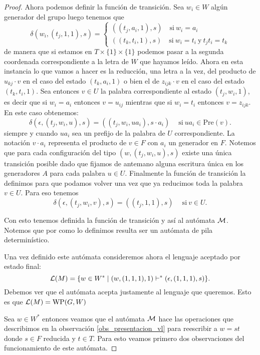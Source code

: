 \documentclass[tesis.tex]{subfiles}
\begin{document}
\begin{proof}
	Ahora podemos definir la función de transición. 
	Sea $w_i \in W$ algún generador del grupo luego tenemos que
	\[
	\delta(w_i,(t_j,1,1), s) =
		\begin{cases}
		 ((t_j,a_i,1), s) \quad \text{si} \ w_{i}=a_{i} \\
		 ((t_k,t_i,1), s) \quad \text{si} \ w_{i}=t_{i} \ \text{y} \ t_{j}t_{i} = t_{k}
	\end{cases}\]
	de manera que si estamos en $T \times \{ 1 \} \times \{ 1 \}$ podemos pasar a la segunda coordenada correspondiente a la letra de $W$ que hayamos leído.	
	Ahora en esta instancia lo que vamos a hacer es la reducción, una letra a la vez, del producto de $u_{kj} \cdot v$ en el caso del estado $(t_k,a_i,1)$ o bien el de $z_{ijk} \cdot v$ en el caso del estado $(t_k,t_i,1)$.
	Sea entonces $v \in U$ la palabra correspondiente al estado $(t_{j},w_{i},1)$, es decir que si $w_{i} = a_{i}$ entonces $v = u_{ij}$ mientras que si $w_{i} = t_{i}$ entonces $v = z_{ijk}$. 
	En este caso obtenemos:
	\begin{equation*}
		\delta(\epsilon,(t_j,w_i,u), s) = ((t_j,w_i,u a_i), s \cdot a_i ) \quad \ \text{si} \ ua_{i} \in \text{Pre}(v).
	\end{equation*}
	siempre y cuando $ua_i$ sea un prefijo de la palabra de $U$ correspondiente.
	La notación $v \cdot a_{i}$ representa el producto de $v \in F$ con $a_{i}$ un generador en $F$.
	Notemos que para cada configuración del tipo $(w,(t_{j}, w_{i}, u),s)$ existe una única transición posible dado que fijamos de antemano alguna escritura única en los generadores $A$ para cada palabra $u \in U$.
	Finalmente la función de transición la definimos para que podamos volver una vez que ya reducimos toda la palabra $v \in U$.
	Para eso tenemos 
	\begin{equation*}
		\delta(\epsilon,(t_j,w_i,v), s) = ((t_j,1,1), s) \quad \ \text{si} \ v \in U.		
	\end{equation*}

	
	Con esto tenemos definida la función de transición y así al autómata $\cal M$. 
	Notemos que por como lo definimos resulta ser un autómata de pila determinístico.
		
	Una vez definido este autómata consideremos ahora el lenguaje aceptado por estado final:
	\[
	{\cal L }(M) = \{  w \in W^* \mid (w,(1,1,1),1)   \vdash^*  (\epsilon, (1,1,1), s)  \}.
	\]
	Debemos ver que el autómata acepta justamente al lenguaje que queremos. 
	Esto es que $ {\cal L }(M) = \text{WP}(G,W) $ 
	
	Sea $w \in W^*$ entonces veamos que el autómata $\cal M$ hace las operaciones que describimos en la observación \ref{obs_presentacion_vl} para reescribir a $w = st$ donde $s \in F$ reducida y $t \in T$.
	Para esto veamos primero dos observaciones del funcionamiento de este autómata.
	

\end{proof}
\end{document}
